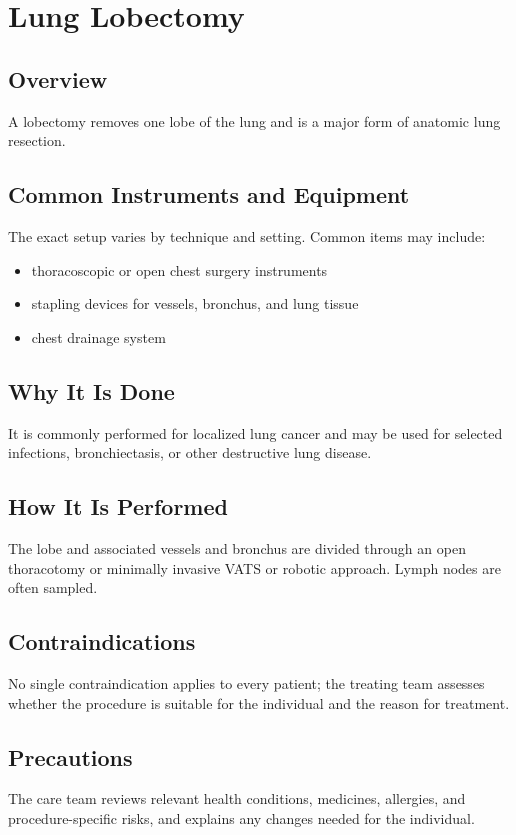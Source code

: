 \chapter{Lung Lobectomy}
\section*{Overview}
A lobectomy removes one lobe of the lung and is a major form of anatomic lung resection.
\section*{Common Instruments and Equipment}
The exact setup varies by technique and setting. Common items may include:
\begin{itemize}[nosep,leftmargin=*]
  \item thoracoscopic or open chest surgery instruments
  \item stapling devices for vessels, bronchus, and lung tissue
  \item chest drainage system
\end{itemize}

\section*{Why It Is Done}
It is commonly performed for localized lung cancer and may be used for selected infections, bronchiectasis, or other destructive lung disease.
\section*{How It Is Performed}
The lobe and associated vessels and bronchus are divided through an open thoracotomy or minimally invasive VATS or robotic approach. Lymph nodes are often sampled.
\section*{Contraindications}
No single contraindication applies to every patient; the treating team assesses whether the procedure is suitable for the individual and the reason for treatment.

\section*{Precautions}
The care team reviews relevant health conditions, medicines, allergies, and procedure-specific risks, and explains any changes needed for the individual.

